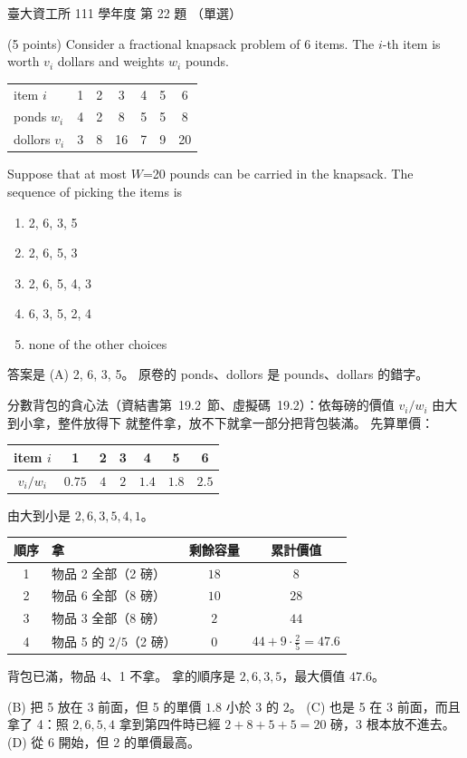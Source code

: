 \begin{pastexam}[label={px:ntu-111-dsaa-22}]{臺大資工所 111 學年度 第 22 題}
（單選）

(5 points) Consider a fractional knapsack problem of 6 items. The $i$-th item is worth $v_i$ dollars
and weights $w_i$ pounds.
\begin{center}
\begin{tabular}{lcccccc}
item $i$ & 1 & 2 & 3 & 4 & 5 & 6\\
ponds $w_i$ & 4 & 2 & 8 & 5 & 5 & 8\\
dollors $v_i$ & 3 & 8 & 16 & 7 & 9 & 20
\end{tabular}
\end{center}
Suppose that at most $W$=20 pounds can be carried in the knapsack. The sequence of picking the
items is
\begin{enumerate}[label=(\Alph*)]
\item 2, 6, 3, 5
\item 2, 6, 5, 3
\item 2, 6, 5, 4, 3
\item 6, 3, 5, 2, 4
\item none of the other choices
\end{enumerate}
\end{pastexam}

\begin{pastsoln}
答案是 (A) 2, 6, 3, 5。 原卷的 ponds、dollors 是 pounds、dollars 的錯字。

分數背包的貪心法（資結書第~19.2~節、虛擬碼~19.2）：依每磅的價值 $v_i / w_i$ 由大到小拿，整件放得下
就整件拿，放不下就拿一部分把背包裝滿。 先算單價：
\begin{center}
\begin{tabular}{ccccccc}
\toprule
item $i$ & 1 & 2 & 3 & 4 & 5 & 6 \\
\midrule
$v_i / w_i$ & $0.75$ & $4$ & $2$ & $1.4$ & $1.8$ & $2.5$ \\
\bottomrule
\end{tabular}
\end{center}
由大到小是 $2, 6, 3, 5, 4, 1$。
\begin{center}
\begin{tabular}{clcc}
\toprule
順序 & 拿 & 剩餘容量 & 累計價值 \\
\midrule
1 & 物品 2 全部（2 磅） & $18$ & $8$ \\
2 & 物品 6 全部（8 磅） & $10$ & $28$ \\
3 & 物品 3 全部（8 磅） & $2$ & $44$ \\
4 & 物品 5 的 $2/5$（2 磅） & $0$ & $44 + 9 \cdot \frac{2}{5} = 47.6$ \\
\bottomrule
\end{tabular}
\end{center}
背包已滿，物品 4、1 不拿。 拿的順序是 $2, 6, 3, 5$，最大價值 $47.6$。

(B) 把 5 放在 3 前面，但 5 的單價 $1.8$ 小於 3 的 $2$。 (C) 也是 5 在 3 前面，而且拿了 4：照 $2, 6, 5, 4$
拿到第四件時已經 $2 + 8 + 5 + 5 = 20$ 磅，3 根本放不進去。 (D) 從 6 開始，但 2 的單價最高。
\end{pastsoln}
